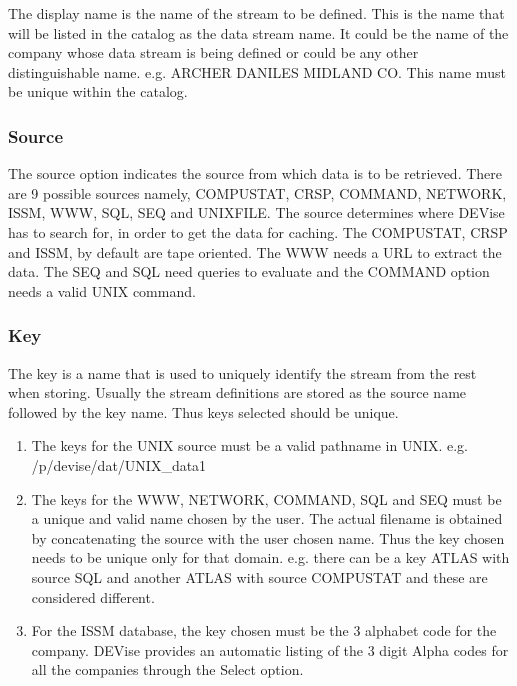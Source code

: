The display name is the name of the stream to be defined. This is the name that will be listed in the catalog as the data stream name. It could be the name of the company whose data stream is being defined or could be any other distinguishable name.  e.g. ARCHER DANILES MIDLAND CO. This name must be unique within the catalog.

\subsubsection{Source}

The source option indicates the source from which data is to be retrieved. There are 9 possible sources namely, COMPUSTAT, CRSP, COMMAND, NETWORK, ISSM, WWW, SQL, SEQ and UNIXFILE. The source determines where DEVise has to search for, in order to get the data for caching. The COMPUSTAT, CRSP and ISSM, by default are tape oriented. The WWW needs a URL to extract the data. The SEQ and SQL need queries to evaluate and the COMMAND option needs a valid UNIX command.

\subsubsection{Key}

The key is a name that is used to uniquely identify the stream from the rest when storing. Usually the stream definitions are stored as the source name followed by the key name. Thus keys selected should be unique. 
\begin{enumerate}

\item
The keys for the UNIX source must be a valid pathname in UNIX.
e.g. /p/devise/dat/UNIX\_data1

\item
The keys for the WWW, NETWORK, COMMAND, SQL and SEQ must be a unique and valid name chosen by the user. The actual filename is obtained by concatenating the source with the user chosen name. Thus the key chosen needs to be unique only for that domain. e.g. there can be a key ATLAS with source SQL and another ATLAS with source COMPUSTAT and these are considered different.

\item
For the ISSM database, the key chosen must be the 3 alphabet code for the company. DEVise provides an automatic listing of the 3 digit Alpha codes for all the companies through the Select option.

\end{enumerate}

